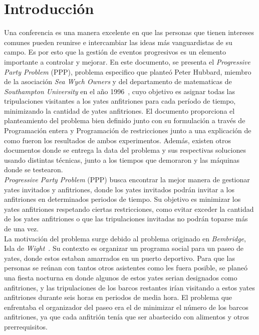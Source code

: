 \documentclass[letter, 10pt]{article}
\begin{document}
\section{Introducción}
Una conferencia es una manera excelente en que las personas que tienen intereses comunes pueden reunirse e intercambiar las ideas m\'as vanguardistas de su campo. Es por esto que la gestión de eventos progresivos es un elemento importante a controlar y mejorar. En este documento, se presenta el \textit{Progressive Party Problem} (PPP), problema especifico que plante\'o Peter Hubbard, miembro de la asociación \textit{Sea Wych Owners} y del departamento de matematicas de \textit{Southampton University} en el a\~no 1996~\cite{Kalvelagen20031713}, cuyo objetivo es asignar todas las tripulaciones visitantes a los yates anfitriones para cada período de tiempo, minimizando la cantidad de yates anfitriones. El documento proporciona el planteamiento del problema bien definido junto con su formulación a través de Programación entera y Programación de restricciones junto a una explicación de como fueron los resultados de ambos experimentos. Además, existen otros documentos donde se entrega la data del problema y sus respectivas soluciones usando distintas técnicas, junto a los tiempos que demoraron y las máquinas donde se testearon.
\\

\textit{Progressive Party Problem} (PPP) busca encontrar la mejor manera de gestionar yates invitados y anfitriones, donde los yates invitados podrán invitar a los anfitriones en determinados periodos de tiempo. Su objetivo es minimizar los yates anfitriones respetando ciertas restricciones, como evitar exceder la cantidad de los yates anfitriones o que las tripulaciones invitadas no podrán toparse más de una vez.
\\

La motivación del problema surge debido al problema originado en \textit{Bembridge}, Isla de \textit{Wight}~\cite{Kalvelagen20031713}. Su contexto es organizar un programa social para un paseo de yates, donde estos estaban amarrados en un puerto deportivo. Para que las personas se reúnan con tantos otros asistentes como les fuera posible, se planeó una fiesta nocturna en donde algunos de estos yates serian designados como anfitriones, y las tripulaciones de los barcos restantes irían visitando a estos yates anfitriones durante seis horas en periodos de media hora. El problema que enfrentaba el organizador del paseo era el de minimizar el número de los barcos anfitriones, ya que cada anfitrión tenía que ser abastecido con alimentos y otros prerrequisitos. 
\end{document}
